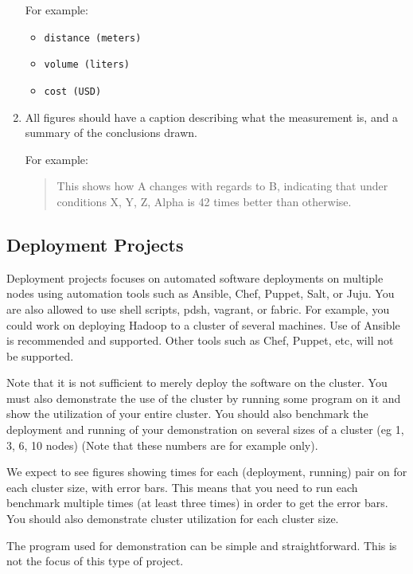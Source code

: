 \begin{enumerate}
  For example:

  \begin{itemize}

  \item
    \texttt{distance\ (meters)}
  \item
    \texttt{volume\ (liters)}
  \item
    \texttt{cost\ (USD)}
  \end{itemize}
\item
  All figures should have a caption describing what the measurement is,
  and a summary of the conclusions drawn.

  For example:

  \begin{quote}
  This shows how A changes with regards to B, indicating that under
  conditions X, Y, Z, Alpha is 42 times better than otherwise.
  \end{quote}
\end{enumerate}

\subsection{Deployment Projects}\label{deployment-projects}

Deployment projects focuses on automated software deployments on
multiple nodes using automation tools such as Ansible, Chef, Puppet,
Salt, or Juju. You are also allowed to use shell scripts, pdsh, vagrant,
or fabric. For example, you could work on deploying Hadoop to a cluster
of several machines. Use of Ansible is recommended and supported. Other
tools such as Chef, Puppet, etc, will not be supported.

Note that it is not sufficient to merely deploy the software on the
cluster. You must also demonstrate the use of the cluster by running
some program on it and show the utilization of your entire cluster. You
should also benchmark the deployment and running of your demonstration
on several sizes of a cluster (eg 1, 3, 6, 10 nodes) (Note that these
numbers are for example only).

We expect to see figures showing times for each (deployment, running)
pair on for each cluster size, with error bars. This means that you need
to run each benchmark multiple times (at least three times) in order to
get the error bars. You should also demonstrate cluster utilization for
each cluster size.

The program used for demonstration can be simple and straightforward.
This is not the focus of this type of project.

